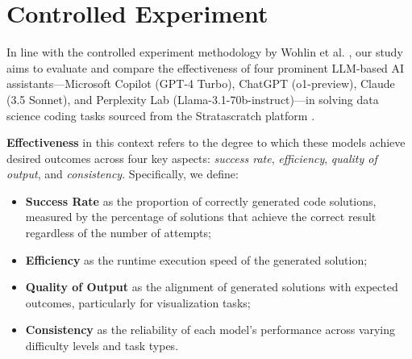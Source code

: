 \documentclass[conference]{IEEEtran}
\begin{document}



\section{Controlled Experiment} \label{sec:controlled}
In line with the controlled experiment methodology by Wohlin et al. \cite{wohlin2012experimentation}, our study aims to evaluate and compare the effectiveness of four prominent LLM-based AI assistants—Microsoft Copilot (GPT-4 Turbo), ChatGPT (o1-preview), Claude (3.5 Sonnet), and Perplexity Lab (Llama-3.1-70b-instruct)—in solving data science coding tasks sourced from the Stratascratch platform \cite{stratascratch_master_coding}. 

\textbf{Effectiveness} in this context refers to the degree to which these models achieve desired outcomes across four key aspects: \textit{success rate}, \textit{efficiency}, \textit{quality of output}, and \textit{consistency}. Specifically, we define:
\begin{itemize}
    \item \textbf{Success Rate} as the proportion of correctly generated code solutions, measured by the percentage of solutions that achieve the correct result regardless of the number of attempts;
    \item \textbf{Efficiency} as the runtime execution speed of the generated solution;
    \item \textbf{Quality of Output} as the alignment of generated solutions with expected outcomes, particularly for visualization tasks;
    \item \textbf{Consistency} as the reliability of each model's performance across varying difficulty levels and task types.
\end{itemize}
\end{document}
